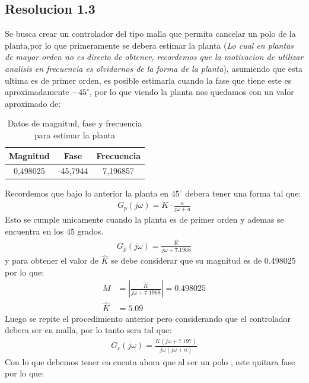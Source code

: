 \documentclass[
  11pt,
  letterpaper,
   addpoints,
   answers
  ]{exam}
\begin{document}
\begin{questions}
\begin{solution}
    \subsection*{Resolucion 1.3}
    Se busca crear un controlador del tipo malla que permita cancelar un polo de la planta,por lo que primeramente se debera estimar la planta (\textit{Lo cual en plantas de mayor orden no es directo de obtener, recordemos que la motivacion de utilizar analisis en frecuencia es olvidarnos de la forma de la planta}), asumiendo que esta ultima es de primer orden, es posible estimarla cuando la fase que tiene este es aproximadamente $-45^{\circ}$, por lo que viendo la planta nos quedamos con un valor aproximado de:
    \begin{table}[H]
        \centering
        \footnotesize
        \begin{tabular}{|c|c|c|}
        \hline
        \textbf{Magnitud} & \textbf{Fase} & \textbf{Frecuencia} \\
        \hline
        0,498025 & -45,7944 & 7,196857 \\
        \hline
        \end{tabular}
        \caption{Datos de magnitud, fase y frecuencia para estimar la planta}
    \end{table}
    Recordemos que bajo lo anterior la planta en $45^{\circ}$ debera tener una forma tal que:
    \begin{align}
        G_{p}(j\omega) = K \cdot \frac{ a }{j\omega + a}
    \end{align}
    Esto se cumple unicamente cuando la planta es de primer orden y ademas se encuentra en los 45 grados.
    \begin{align}
        G_{p}(j\omega) = \frac{\hat{K}}{j\omega + 7.1968}
    \end{align}
    y para obtener el valor de $\hat{K}$ se debe considerar que su magnitud es de $0.498025$ por lo que:
    \begin{align}
        M &= \left|\frac{\hat{K}}{j\omega + 7.1968}\right| = 0.498025\\
        \hat{K} &= 5.09
    \end{align}
    Luego se repite el procedimiento anterior pero considerando que el controlador debera ser en malla, por lo tanto sera tal que:
    \begin{align}
        G_{c}(j\omega) = \frac{K ( j\omega + 7.197)}{j\omega ( j\omega + a)} 
    \end{align}
    Con lo que debemos tener en cuenta ahora que al ser un polo , este quitara fase por lo que:

\end{solution}
\end{questions}
\end{document}

